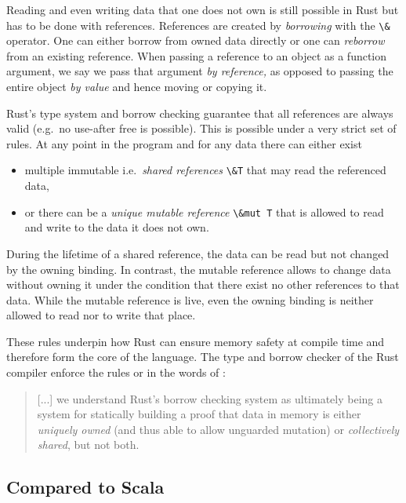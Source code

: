 Reading and even writing data that one does not own is still possible in
Rust but has to be done with references. References are created by
\emph{borrowing} with the \passthrough{\lstinline!\&!} operator. One can
either borrow from owned data directly or one can \emph{reborrow} from
an existing reference. When passing a reference to an object as a
function argument, we say we pass that argument \emph{by reference,} as
opposed to passing the entire object \emph{by value} and hence moving or
copying it.

Rust's type system and borrow checking guarantee that all references are
always valid (e.g.~no use-after free is possible). This is possible
under a very strict set of rules. At any point in the program and for
any data there can either exist

\begin{itemize}
\tightlist
\item
  multiple immutable i.e.~\emph{shared references}
  \passthrough{\lstinline!\&T!} that may read the referenced data,
\item
  or there can be a \emph{unique mutable reference}
  \passthrough{\lstinline!\&mut T!} that is allowed to read and write
  to the data it does not own.
\end{itemize}

During the lifetime of a shared reference, the data can be read but not
changed by the owning binding. In contrast, the mutable reference allows
to change data without owning it under the condition that there exist no
other references to that data. While the mutable reference is live, even
the owning binding is neither allowed to read nor to write that place.

These rules underpin how Rust can ensure memory safety at compile time
and therefore form the core of the language. The type and borrow checker
of the Rust compiler enforce the rules or in the words of \citet{oxide}:

\begin{quote}
{[...]} we understand Rust's borrow checking system as ultimately being a system
for statically building a proof that data in memory is either
\emph{uniquely owned} (and thus able to allow unguarded mutation) or
\emph{collectively shared}, but not both.
\end{quote}

\subsection{Compared to Scala}

